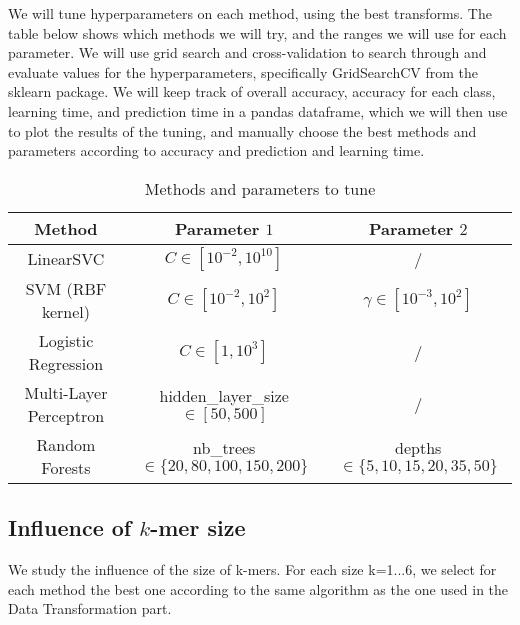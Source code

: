 \documentclass{article}
\begin{document}
\begin{multicols}{2}
		We will tune hyperparameters on each method, using the best transforms. The table below shows which methods we will try, and the ranges we will use for each parameter. We will use grid search and cross-validation to search through and evaluate values for the hyperparameters, specifically GridSearchCV from the sklearn package. We will keep track of overall accuracy, accuracy for each class, learning time, and prediction time in a pandas dataframe, which we will then use to plot the results of the tuning, and manually choose the best methods and parameters according to accuracy and prediction and learning time.
		
		\begin{table*}[h]
			\centering
			\begin{tabular}{c|c|c}
				Method & Parameter $1$ & Parameter $2$ \\
				\hline
				LinearSVC & $C \in [10^{-2}, 10^{10}]$ & / \\
				SVM (RBF kernel) & $C \in [10^{-2}, 10^2]$ & $ \gamma \in [10^{-3}, 10^2]$ \\
				Logistic Regression    & $ C \in [1, 10^3]$ & / \\
				Multi-Layer Perceptron   & hidden\_layer\_size$\in [50, 500]$ & / \\
				Random Forests & nb\_trees$\in \{20, 80, 100, 150, 200\}$ & depths$\in \{ 5, 10, 15, 20, 35, 50 \}$ \\
				\hline
			\end{tabular}
			\caption{Methods and parameters to tune}
			\label{table:ta}
		\end{table*}
		
		\subsection{Influence of $k$-mer size}
		
		We study the influence of the size of k-mers. For each size k=1...6, we select for each method the best one according to the same algorithm as the one used in the Data Transformation part. 
		
		
		
	\end{multicols}

	
	
\end{document}
